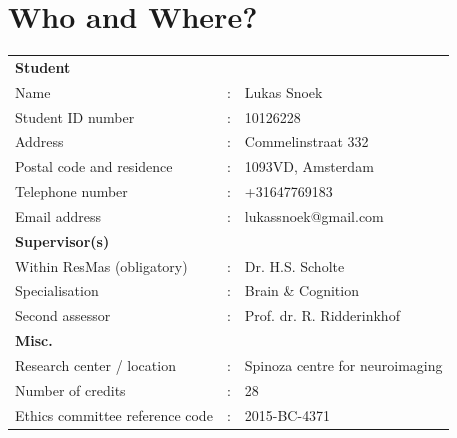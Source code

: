 \documentclass[12pt,a4paper]{article}\usepackage[]{graphicx}\usepackage[]{color}
\makeatletter
\newenvironment{kframe}{%
 \def\at@end@of@kframe{}%
 \ifinner\ifhmode%
  \def\at@end@of@kframe{\end{minipage}}%
  \begin{minipage}{\columnwidth}%
 \fi\fi%
 \def\FrameCommand##1{\hskip\@totalleftmargin \hskip-\fboxsep
 \colorbox{shadecolor}{##1}\hskip-\fboxsep
     \hskip-\linewidth \hskip-\@totalleftmargin \hskip\columnwidth}%
 \MakeFramed {\advance\hsize-\width
   \@totalleftmargin\z@ \linewidth\hsize
   \@setminipage}}%
 {\par\unskip\endMakeFramed%
 \at@end@of@kframe}
\newenvironment{knitrout}{}{} %
\makeatother
\begin{document}

\begin{knitrout}
\color{fgcolor}\begin{kframe}


{\ttfamily\noindent\color{warningcolor}{\#\# Warning: package 'ggplot2' was built under R version 3.1.3}}\end{kframe}
\end{knitrout}

\newcommand\wordcount{\immediate\write18{texcount -sub=section \jobname.tex  | grep "Section" | sed -e 's/+.*//' | sed -n \thesection p > 'count.txt'}Word count: }

\onehalfspacing

\section{Who and Where?}
\vspace{\baselineskip}

\begin{tabular}{l l l}
\textbf{Student} \\
Name & : &                              Lukas Snoek\\
Student ID number & : &                 10126228 \\
Address & : &                           Commelinstraat 332 \\
Postal code and residence & : &         1093VD, Amsterdam \\
Telephone number & : &                  +31647769183 \\
Email address & : &                     lukassnoek@gmail.com \\[0.5cm]

\textbf{Supervisor(s)} \\
Within ResMas (obligatory) & : &        Dr. H.S. Scholte \\
Specialisation & : &                    Brain \& Cognition \\
Second assessor & : &                   Prof. dr. R. Ridderinkhof \\[0.5cm]

\textbf{Misc.} \\
Research center / location & : &        Spinoza centre for neuroimaging \\
Number of credits & : &                 28 \\
Ethics committee reference code & : &   2015-BC-4371 \\

\end{tabular}
\end{document}
